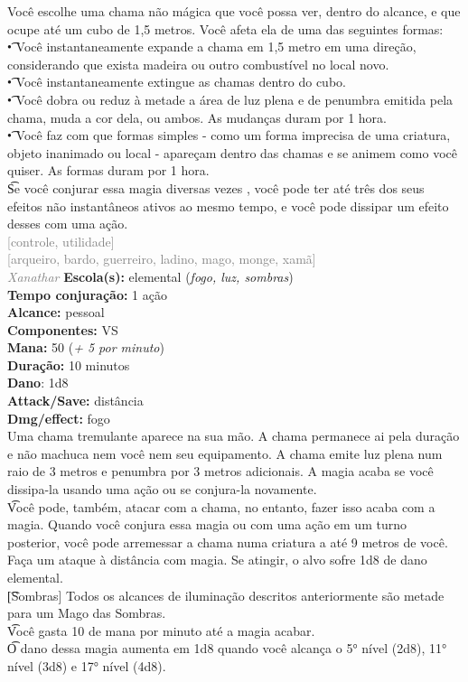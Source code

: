 \documentclass{RPG_Adventure}[2021/10/20]
\begin{document}
{\normalsize Você escolhe uma chama não mágica que você possa ver, dentro do alcance, e que ocupe até um cubo de 1,5 metros. Você afeta ela de uma das seguintes formas:\\\t • Você instantaneamente expande a chama em 1,5 metro em uma direção, considerando que exista madeira ou outro combustível no local novo.\\\t • Você instantaneamente extingue as chamas dentro do cubo.\\\t • Você dobra ou reduz à metade a área de luz plena e de penumbra emitida pela chama, muda a cor dela, ou ambos. As mudanças duram por 1 hora.\\\t • Você faz com que formas simples - como um forma imprecisa de uma criatura, objeto inanimado ou local - apareçam dentro das chamas e se animem como você quiser. As formas duram por 1 hora.\\\t Se você conjurar essa magia diversas vezes , você pode ter até três dos seus efeitos não instantâneos ativos ao mesmo tempo, e você pode dissipar um efeito desses com uma ação.\\}
{\scriptsize \textcolor{gray}{[controle, utilidade]\\}}
{\scriptsize \textcolor{gray}{[arqueiro, bardo, guerreiro, ladino, mago, monge, xamã]\\}}
{\tiny \textcolor{gray}{\textit{Xanathar}}}\jump{}
{\small \t \textbf{Escola(s):} elemental (\textit{fogo, luz, sombras})\\\t \textbf{Tempo conjuração:} 1 ação\\\t \textbf{Alcance:} pessoal\\\t \textbf{Componentes:} VS\\\t \textbf{Mana:} 50 (\textit{+ 5 por minuto})\\\t \textbf{Duração:} 10 minutos\\\t \textbf{Dano}: 1d8\\\t \textbf{Attack/Save:} distância\\\t \textbf{Dmg/effect:} fogo\\}
{\normalsize Uma chama tremulante aparece na sua mão. A chama permanece ai pela duração e não machuca nem você nem seu equipamento. A chama emite luz plena num raio de 3 metros e penumbra por 3 metros adicionais. A magia acaba se você dissipa-la usando uma ação ou se conjura-la novamente.\\\t Você pode, também, atacar com a chama, no entanto, fazer isso acaba com a magia. Quando você conjura essa magia ou com uma ação em um turno posterior, você pode arremessar a chama numa criatura a até 9 metros de você. Faça um ataque à distância com magia. Se atingir, o alvo sofre 1d8 de dano elemental.\\\t [Sombras] Todos os alcances de iluminação descritos anteriormente são metade para um Mago das Sombras.\\\t Você gasta 10 de mana por minuto até a magia acabar.\\\t O dano dessa magia aumenta em 1d8 quando você alcança o 5° nível (2d8), 11° nível (3d8) e 17° nível (4d8).\\}
\end{document}
